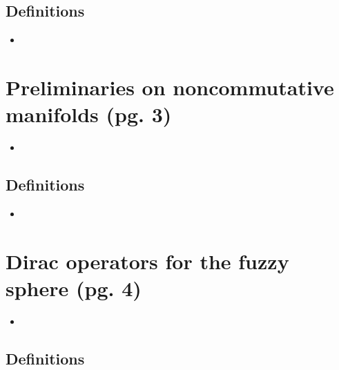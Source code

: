 \documentclass{article}
\begin{document}
\subsection*{Definitions}

    \begin{itemize}

    \item 
    
    \end{itemize}

\section{Preliminaries on noncommutative manifolds (pg. 3)}

\begin{itemize}
        
    \item 
        
    \end{itemize}
    
\subsection*{Definitions}

    \begin{itemize}

    \item 
    
    \end{itemize}

\section{Dirac operators for the fuzzy sphere (pg. 4)}

\begin{itemize}
        
    \item 
        
    \end{itemize}
    
\subsection*{Definitions}
\end{document}
